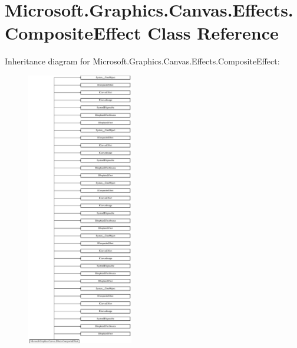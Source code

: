 \hypertarget{class_microsoft_1_1_graphics_1_1_canvas_1_1_effects_1_1_composite_effect}{}\section{Microsoft.\+Graphics.\+Canvas.\+Effects.\+Composite\+Effect Class Reference}
\label{class_microsoft_1_1_graphics_1_1_canvas_1_1_effects_1_1_composite_effect}
Inheritance diagram for Microsoft.\+Graphics.\+Canvas.\+Effects.\+Composite\+Effect\+:\begin{figure}[H]
\begin{center}
\leavevmode
\includegraphics[height=12.000000cm]{class_microsoft_1_1_graphics_1_1_canvas_1_1_effects_1_1_composite_effect}
\end{center}
\end{figure}
